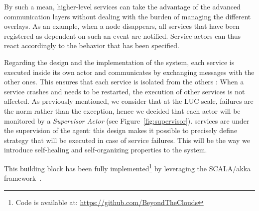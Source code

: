 By such a mean, higher-level services can take the advantage of the advanced
communication layers without dealing with the burden of managing the different
overlays. As an example, when a node disappears, all services that
have been registered as dependent on such an event are notified. 
Service actors can thus react accordingly to the behavior that has been specified. 
%
%
%
%

Regarding the design and the implementation of the \discovery system, each
service is executed inside its own actor and communicates by
exchanging messages with the other ones. This ensures that each
service is isolated from the others : When a service crashes and needs to be
restarted, the execution of other services is not affected. 
%
As previously mentioned, we consider that at the LUC scale, failures are the norm
rather than the exception, hence we decided that each actor will be monitored
by a \emph{Supervisor Actor} (see Figure~\ref{fig:supervisor}). \discovery services are under the supervision of the \discovery agent: this design makes it possible to precisely define strategy
that will be executed in case of service failures. This will be the way we
introduce self-healing and self-organizing properties to the \discovery system.

This building block has been fully implemented\footnote{Code is available at:
\href{https://github.com/BeyondTheClouds}{\url{https://github.com/BeyondTheClouds}}} by 
leveraging the SCALA/akka framework~\cite{akka:www}.

